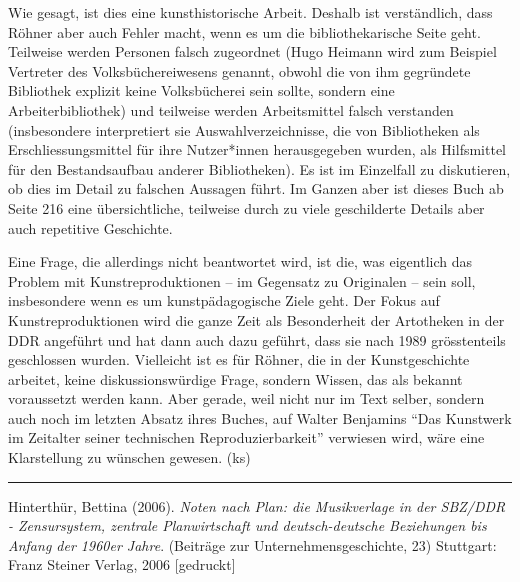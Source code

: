 \documentclass[a4paper,
fontsize=11pt,
oneside,
numbers=noperiodatend,
parskip=half-,
bibliography=totoc,
final
]{scrartcl}
\begin{document}
Wie gesagt, ist dies eine kunsthistorische Arbeit. Deshalb ist
verständlich, dass Röhner aber auch Fehler macht, wenn es um die
bibliothekarische Seite geht. Teilweise werden Personen falsch
zugeordnet (Hugo Heimann wird zum Beispiel Vertreter des
Volksbüchereiwesens genannt, obwohl die von ihm gegründete Bibliothek
explizit keine Volksbücherei sein sollte, sondern eine
Arbeiterbibliothek) und teilweise werden Arbeitsmittel falsch verstanden
(insbesondere interpretiert sie Auswahlverzeichnisse, die von
Bibliotheken als Erschliessungsmittel für ihre Nutzer*innen
herausgegeben wurden, als Hilfsmittel für den Bestandsaufbau anderer
Bibliotheken). Es ist im Einzelfall zu diskutieren, ob dies im Detail zu
falschen Aussagen führt. Im Ganzen aber ist dieses Buch ab Seite 216
eine übersichtliche, teilweise durch zu viele geschilderte Details aber
auch repetitive Geschichte.

Eine Frage, die allerdings nicht beantwortet wird, ist die, was
eigentlich das Problem mit Kunstreproduktionen -- im Gegensatz zu
Originalen -- sein soll, insbesondere wenn es um kunstpädagogische Ziele
geht. Der Fokus auf Kunstreproduktionen wird die ganze Zeit als
Besonderheit der Artotheken in der DDR angeführt und hat dann auch dazu
geführt, dass sie nach 1989 grösstenteils geschlossen wurden. Vielleicht
ist es für Röhner, die in der Kunstgeschichte arbeitet, keine
diskussionswürdige Frage, sondern Wissen, das als bekannt voraussetzt
werden kann. Aber gerade, weil nicht nur im Text selber, sondern auch
noch im letzten Absatz ihres Buches, auf Walter Benjamins ``Das
Kunstwerk im Zeitalter seiner technischen Reproduzierbarkeit'' verwiesen
wird, wäre eine Klarstellung zu wünschen gewesen. (ks)

\begin{center}\rule{0.5\linewidth}{0.5pt}\end{center}

Hinterthür, Bettina (2006). \emph{Noten nach Plan: die Musikverlage in
der SBZ/DDR - Zensursystem, zentrale Planwirtschaft und deutsch-deutsche
Beziehungen bis Anfang der 1960er Jahre}. (Beiträge zur
Unternehmensgeschichte, 23) Stuttgart: Franz Steiner Verlag, 2006
{[}gedruckt{]}
\end{document}
